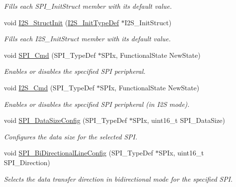 \begin{DoxyCompactItemize}
\begin{DoxyCompactList}\small\item\em Fills each S\+P\+I\+\_\+\+Init\+Struct member with its default value. \end{DoxyCompactList}\item 
void \mbox{\hyperlink{group___s_p_i___group1_ga7470ec1d0759fdeeb42c7fe71a3b41b7}{I2\+S\+\_\+\+Struct\+Init}} (\mbox{\hyperlink{struct_i2_s___init_type_def}{I2\+S\+\_\+\+Init\+Type\+Def}} $\ast$I2\+S\+\_\+\+Init\+Struct)
\begin{DoxyCompactList}\small\item\em Fills each I2\+S\+\_\+\+Init\+Struct member with its default value. \end{DoxyCompactList}\item 
void \mbox{\hyperlink{group___s_p_i___group1_gaa31357879a65ee1ed7223f3b9114dcf3}{S\+P\+I\+\_\+\+Cmd}} (S\+P\+I\+\_\+\+Type\+Def $\ast$S\+P\+Ix, Functional\+State New\+State)
\begin{DoxyCompactList}\small\item\em Enables or disables the specified S\+PI peripheral. \end{DoxyCompactList}\item 
void \mbox{\hyperlink{group___s_p_i___group1_gafe061c71bbc5b4224f3f2884dc53739e}{I2\+S\+\_\+\+Cmd}} (S\+P\+I\+\_\+\+Type\+Def $\ast$S\+P\+Ix, Functional\+State New\+State)
\begin{DoxyCompactList}\small\item\em Enables or disables the specified S\+PI peripheral (in I2S mode). \end{DoxyCompactList}\item 
void \mbox{\hyperlink{group___s_p_i___group1_gafc82e90841d7879535d655c035709cb1}{S\+P\+I\+\_\+\+Data\+Size\+Config}} (S\+P\+I\+\_\+\+Type\+Def $\ast$S\+P\+Ix, uint16\+\_\+t S\+P\+I\+\_\+\+Data\+Size)
\begin{DoxyCompactList}\small\item\em Configures the data size for the selected S\+PI. \end{DoxyCompactList}\item 
void \mbox{\hyperlink{group___s_p_i___group1_ga166171c421fc51da7714723524d41b45}{S\+P\+I\+\_\+\+Bi\+Directional\+Line\+Config}} (S\+P\+I\+\_\+\+Type\+Def $\ast$S\+P\+Ix, uint16\+\_\+t S\+P\+I\+\_\+\+Direction)
\begin{DoxyCompactList}\small\item\em Selects the data transfer direction in bidirectional mode for the specified S\+PI. \end{DoxyCompactList}\item 

\end{DoxyCompactItemize}
